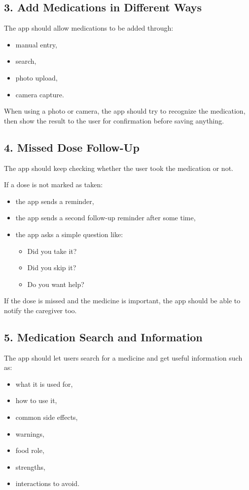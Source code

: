 \documentclass[11pt,a4paper]{article}
\begin{document}
\subsection{3. Add Medications in Different Ways}
The app should allow medications to be added through:
\begin{itemize}
    \item manual entry,
    \item search,
    \item photo upload,
    \item camera capture.
\end{itemize}

When using a photo or camera, the app should try to recognize the medication, then show the result to the user for confirmation before saving anything.

\subsection{4. Missed Dose Follow-Up}
The app should keep checking whether the user took the medication or not.

If a dose is not marked as taken:
\begin{itemize}
    \item the app sends a reminder,
    \item the app sends a second follow-up reminder after some time,
    \item the app asks a simple question like:
    \begin{itemize}
        \item Did you take it?
        \item Did you skip it?
        \item Do you want help?
    \end{itemize}
\end{itemize}

If the dose is missed and the medicine is important, the app should be able to notify the caregiver too.

\subsection{5. Medication Search and Information}
The app should let users search for a medicine and get useful information such as:
\begin{itemize}
    \item what it is used for,
    \item how to use it,
    \item common side effects,
    \item warnings,
    \item food role,
    \item strengths,
    \item interactions to avoid.
\end{itemize}
\end{document}
